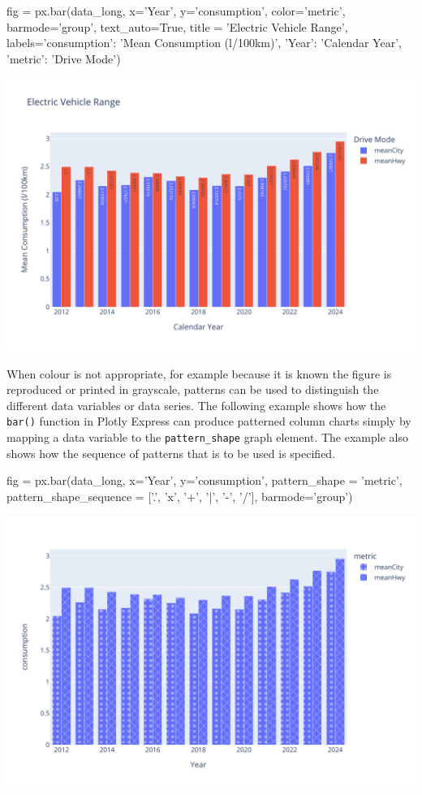 \begin{pythoncode}
fig = px.bar(data_long,
  x='Year', y='consumption', color='metric', 
  barmode='group',
  text_auto=True,
  title = 'Electric Vehicle Range',
  labels={'consumption': 'Mean Consumption (l/100km)', 
          'Year': 'Calendar Year', 
          'metric': 'Drive Mode'})
\end{pythoncode}

\begin{center}
  \includegraphics[width=.8\textwidth]{px.fuel.columns.labels.pdf}
\end{center}

When colour is not appropriate, for example because it is known the figure is reproduced or printed in grayscale, patterns can be used to distinguish the different data variables or data series. The following example shows how the \texttt{bar()} function in Plotly Express can produce patterned column charts simply by mapping a data variable to the \texttt{pattern\_shape} graph element. The example also shows how the sequence of patterns that is to be used is specified.

\begin{pythoncode}
fig = px.bar(data_long, 
   x='Year', y='consumption', pattern_shape = 'metric', 
   pattern_shape_sequence = ['.', 'x', '+', '|', '-', '/'],
   barmode='group')
\end{pythoncode}

\begin{center}
  \includegraphics[width=.8\textwidth]{px.fuel.columnsPatterns.pdf}
\end{center}


